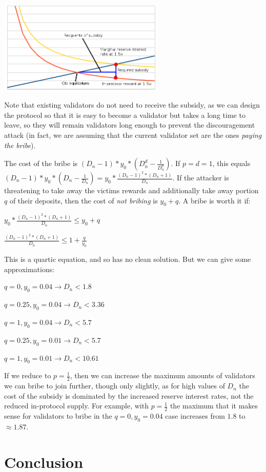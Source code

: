 \documentclass[12pt]{article}
\begin{document}
\includegraphics[width=300px]{disc_chart4.png}

Note that existing validators do not need to receive the subsidy, as we can design the protocol so that it is easy to become a validator but takes a long time to leave, so they will remain validators long enough to prevent the discouragement attack (in fact, we are assuming that the current validator set are the ones \textit{paying the bribe}).

The cost of the bribe is $(D_n - 1) * y_0 * (D_n^d - \frac{1}{D_n^p})$. If $p = d = 1$, this equals $(D_n - 1) * y_0 * (D_n - \frac{1}{D_n}) = y_0 * \frac{(D_n-1)^2 * (D_n+1)}{D_n}$. If the attacker is threatening to take away the victims rewards and additionally take away portion $q$ of their deposits, then the cost of \textit{not bribing} is $y_0 + q$. A bribe is worth it if:

$y_0 * \frac{(D_n-1)^2 * (D_n+1)}{D_n} \le y_0 + q$

$\frac{(D_n-1)^2 * (D_n+1)}{D_n} \le 1 + \frac{q}{y_0}$

This is a quartic equation, and so has no clean solution. But we can give some approximations:

$q = 0, y_0 = 0.04 \rightarrow D_n < 1.8$

$q = 0.25, y_0 = 0.04 \rightarrow D_n < 3.36$

$q = 1, y_0 = 0.04 \rightarrow D_n < 5.7$

$q = 0.25, y_0 = 0.01 \rightarrow D_n < 5.7$

$q = 1, y_0 = 0.01 \rightarrow D_n < 10.61$

If we reduce to $p = \frac{1}{2}$, then we can increase the maximum amounts of validators we can bribe to join further, though only slightly, as for high values of $D_n$ the cost of the subsidy is dominated by the increased reserve interest rates, not the reduced in-protocol supply. For example, with $p = \frac{1}{2}$ the maximum that it makes sense for validators to bribe in the $q = 0, y_0 = 0.04$ case increases from $1.8$ to $\approx 1.87$.

\section{Conclusion}
\end{document}
